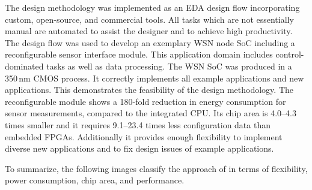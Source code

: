 \documentclass[a4paper,12pt,onsided]{article}
\begin{document}
The design methodology was implemented as an EDA design flow incorporating custom,
open-source, and commercial tools.
All tasks which are not essentially manual are automated to assist the
designer and to achieve high productivity.
The design flow was used to develop an exemplary WSN node SoC including a reconfigurable
sensor interface module.
This application domain includes control-dominated tasks as well as data
processing. 
The WSN SoC was produced in a 350\,nm CMOS process. It correctly implements
all example applications and new applications.
This demonstrates the feasibility of the design methodology.
%
The reconfigurable module shows
a 180-fold reduction in energy consumption for sensor measurements, compared to
the integrated CPU.
Its chip area is
4.0--4.3 times smaller and it requires 9.1--23.4 times less configuration data than
embedded FPGAs.
Additionally it provides
enough flexibility to implement diverse new applications and to fix
design issues of example applications.

To summarize, the following images classify the approach of \cite{Gla15} in terms
of flexibility, power consumption, chip area, and performance.

\vspace{5mm}
\end{document}
